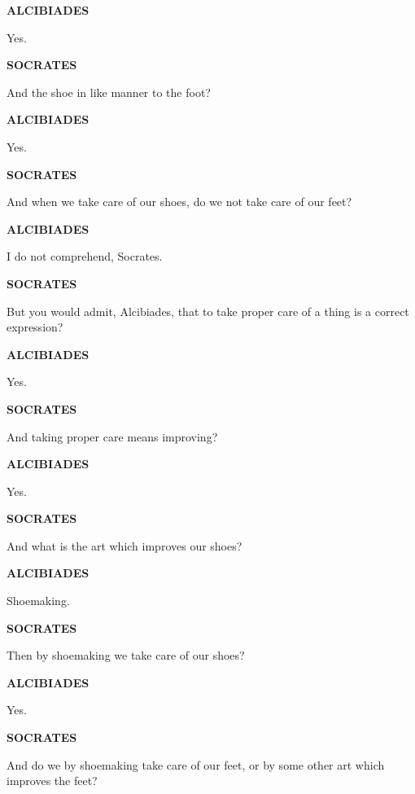 \documentclass[11pt,letter]{article}
\begin{document}
\par \textbf{ALCIBIADES}
\par   Yes.

\par \textbf{SOCRATES}
\par   And the shoe in like manner to the foot?

\par \textbf{ALCIBIADES}
\par   Yes.

\par \textbf{SOCRATES}
\par   And when we take care of our shoes, do we not take care of our feet?

\par \textbf{ALCIBIADES}
\par   I do not comprehend, Socrates.

\par \textbf{SOCRATES}
\par   But you would admit, Alcibiades, that to take proper care of a thing is a correct expression?

\par \textbf{ALCIBIADES}
\par   Yes.

\par \textbf{SOCRATES}
\par   And taking proper care means improving?

\par \textbf{ALCIBIADES}
\par   Yes.

\par \textbf{SOCRATES}
\par   And what is the art which improves our shoes?

\par \textbf{ALCIBIADES}
\par   Shoemaking.

\par \textbf{SOCRATES}
\par   Then by shoemaking we take care of our shoes?

\par \textbf{ALCIBIADES}
\par   Yes.

\par \textbf{SOCRATES}
\par   And do we by shoemaking take care of our feet, or by some other art which improves the feet?
\end{document}
